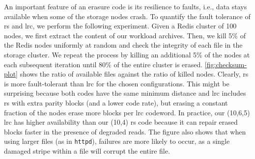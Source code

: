 An important feature of an erasure code is its resilience to faults, i.e., data stays available when some of the storage nodes crash. To quantify the fault tolerance of \ac{rs} and \ac{lrc}, we perform the following experiment. Given a Redis cluster of 100 nodes, we first extract the content of our workload archives. %
Then, we kill 5\% of the Redis nodes uniformly at random and check the integrity of each file in the storage cluster. We repeat the process by killing an additional 5\% of the nodes at each subsequent iteration until 80\% of the entire cluster is erased.
\autoref{fig:checksum-plot} shows the ratio of available files against the ratio of killed nodes.
Clearly, \ac{rs} is more fault-tolerant than \ac{lrc} for the chosen configurations. This might be surprising because both codes have the same minimum distance and \ac{lrc} includes \ac{rs} with extra parity blocks (and a lower code rate), but erasing a constant fraction of the nodes erase more blocks per \ac{lrc} codeword. In practice, our (10,6,5) \ac{lrc} has higher availability than our (10,4) \ac{rs} code because it can repair erased blocks faster in the presence of degraded reads.  The figure also shows that when using larger files (as in \texttt{httpd}), failures are more likely to occur, as a single damaged stripe within a file will corrupt the entire file.

